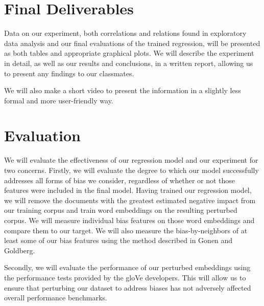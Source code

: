 \documentclass{article}
\begin{document}
    

\section{Final Deliverables}

Data on our experiment, both correlations and relations found in
exploratory data analysis and our final evaluations of the trained
regression, will be presented as both tables and appropriate graphical
plots. We will describe the experiment in detail, as well as our results
and conclusions, in a written report, allowing us to present any
findings to our classmates.

We will also make a short video to present the information in a
slightly less formal and more user-friendly way.

\section{Evaluation}

We will evaluate the effectiveness of our regression model and our
experiment for two concerns. Firstly, we will evaluate the degree to
which our model successfully addresses all forms of bias we consider,
regardless of whether or not those features were included in the final
model. Having trained our regression model, we will remove the documents
with the greatest estimated negative impact from our training
corpus and train word embeddings on the resulting perturbed corpus. We
will measure individual bias features on those word embeddings and
compare them to our target. We will also measure the bias-by-neighbors
of at least some of our bias features using the method described in
Gonen and Goldberg\cite{gonen_lipstick_2019}.

Secondly, we will evaluate the performance of our perturbed embeddings
using the performance tests provided by the gloVe developers. This will
allow us to ensure that perturbing our dataset to address biases has not
adversely affected overall performance benchmarks.

\printbibliography
\end{document}
